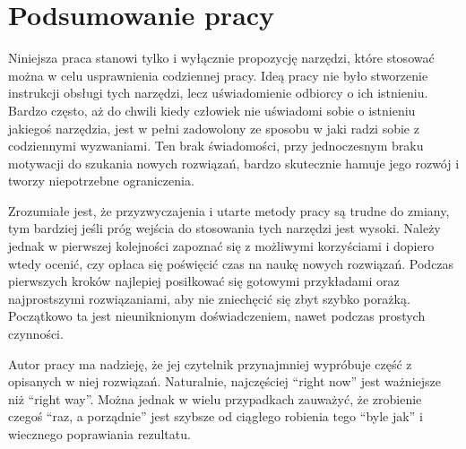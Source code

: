 \chapter{Podsumowanie pracy}

Niniejsza praca stanowi tylko i wyłącznie propozycję narzędzi, które stosować można w celu usprawnienia codziennej pracy. Ideą pracy nie było stworzenie instrukcji obsługi tych narzędzi, lecz uświadomienie odbiorcy o ich istnieniu. Bardzo często, aż do chwili kiedy człowiek nie uświadomi sobie o istnieniu jakiegoś narzędzia, jest w pełni zadowolony ze sposobu w jaki radzi sobie z codziennymi wyzwaniami. Ten brak świadomości, przy jednoczesnym braku motywacji do szukania nowych rozwiązań, bardzo skutecznie hamuje jego rozwój i tworzy niepotrzebne ograniczenia.

Zrozumiałe jest, że przyzwyczajenia i utarte metody pracy są trudne do zmiany, tym bardziej jeśli próg wejścia do stosowania tych narzędzi jest wysoki. Należy jednak w pierwszej kolejności zapoznać się z możliwymi korzyściami i dopiero wtedy ocenić, czy opłaca się poświęcić czas na naukę nowych rozwiązań. Podczas pierwszych kroków najlepiej posiłkować się gotowymi przykładami oraz najprostszymi rozwiązaniami, aby nie zniechęcić się zbyt szybko porażką. Początkowo ta jest nieuniknionym doświadczeniem, nawet podczas prostych czynności.

Autor pracy ma nadzieję, że jej czytelnik przynajmniej wypróbuje część z opisanych w niej rozwiązań. Naturalnie, najczęściej \enquote{right now} jest ważniejsze niż \enquote{right way}. Można jednak w wielu przypadkach zauważyć, że zrobienie czegoś \enquote{raz, a porządnie} jest szybsze od ciągłego robienia tego \enquote{byle jak} i wiecznego poprawiania rezultatu.
